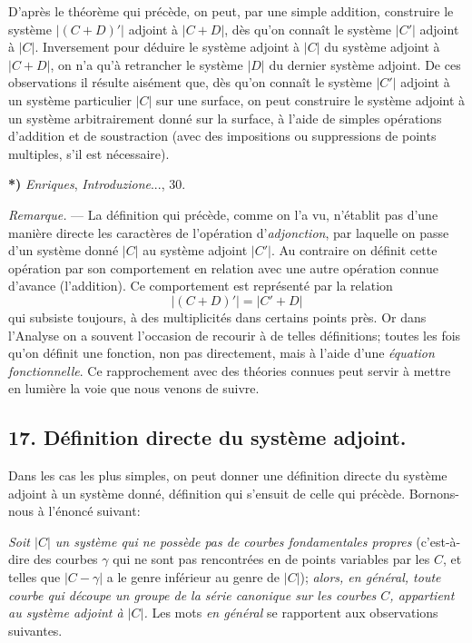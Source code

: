 \documentclass{article}
\begin{document}
D'après le théorème qui précède, on peut, par une simple addition, construire le système $|(C + D)'|$ adjoint à $|C + D|$, dès qu'on connaît le système $|C'|$ adjoint à $|C|$. Inversement pour déduire le système adjoint à $|C|$ du système adjoint à $|C + D|$, on n'a qu'à retrancher le système $|D|$ du dernier système adjoint. De ces observations il résulte aisément que, dès qu'on connaît le système $|C'|$ adjoint à un système particulier $|C|$ sur une surface, on peut construire le système adjoint à un système arbitrairement donné sur la surface, à l'aide de simples opérations d'addition et de soustraction (avec des impositions ou suppressions de points multiples, s'il est nécessaire).

\textbf{*)} \emph{Enriques}, \emph{Introduzione}..., 30.


\emph{Remarque.} --- La définition qui précède, comme on l'a vu, n'établit pas d'une manière directe les caractères de l'opération d'\emph{adjonction}, par laquelle on passe d'un système donné $|C|$ au système adjoint $|C'|$. Au contraire on définit cette opération par son comportement en relation avec une autre opération connue d'avance (l'addition). Ce comportement est représenté par la relation
\[
|(C + D)'| = |C' + D|
\]
qui subsiste toujours, à des multiplicités dans certains points près. Or dans l'Analyse on a souvent l'occasion de recourir à de telles définitions; toutes les fois qu'on définit une fonction, non pas directement, mais à l'aide d'une \emph{équation fonctionnelle}. Ce rapprochement avec des théories connues peut servir à mettre en lumière la voie que nous venons de suivre.

\subsection*{17. Définition directe du système adjoint.}

Dans les cas les plus simples, on peut donner une définition directe du système adjoint à un système donné, définition qui s'ensuit de celle qui précède. Bornons-nous à l'énoncé suivant:

\emph{Soit $|C|$ un système qui ne possède pas de courbes fondamentales propres} (c'est-à-dire des courbes $\gamma$ qui ne sont pas rencontrées en de points variables par les $C$, et telles que $|C - \gamma|$ a le genre inférieur au genre de $|C|$); \emph{alors, en général, toute courbe qui découpe un groupe de la série canonique sur les courbes $C$, appartient au système adjoint à $|C|$.} Les mots \emph{en général} se rapportent aux observations suivantes.
\end{document}
